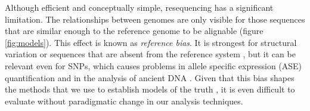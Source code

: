 


Although efficient and conceptually simple, resequencing has a significant limitation.
The relationships between genomes are only visible for those sequences that are similar enough to the reference genome to be alignable (figure \ref{fig:models}).
This effect is known as \emph{reference bias}.
It is strongest for structural variation or sequences that are absent from the reference system \cite{sudmant2015integrated}, but it can be relevant even for SNPs, which causes problems in allele specific expression (ASE) quantification \cite{Castel2015-ef} and in the analysis of ancient DNA \cite{zhou2017antcaller}.
Given that this bias shapes the methods that we use to establish models of the truth \cite{zook2014integrating}, it is even difficult to evaluate without paradigmatic change in our analysis techniques.


